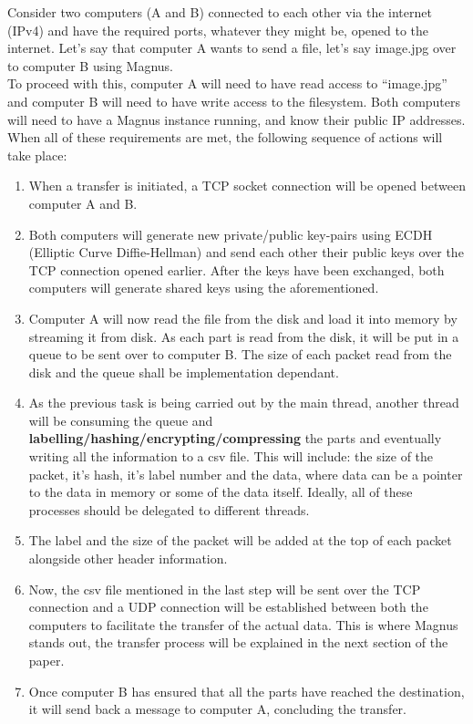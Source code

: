 \documentclass{article}
\begin{document}
Consider two computers (A and B) connected to each other via the internet
(IPv4) and have the required ports, whatever they might be, opened to the
internet. Let's say that computer A wants to send a file, let's say image.jpg
over to computer B using Magnus. \\

To proceed with this, computer A will need to have read access to ``image.jpg''
and computer B will need to have write access to the filesystem. Both computers
will need to have a Magnus instance running, and know their public IP
addresses. \\

When all of these requirements are met, the following sequence of actions will
take place:
\begin{enumerate}
      \item When a transfer is initiated, a TCP socket connection will be opened between
            computer A and B.
      \item Both computers will generate new private/public key-pairs using ECDH (Elliptic
            Curve Diffie-Hellman) and send each other their public keys over the TCP
            connection opened earlier. After the keys have been exchanged, both computers
            will generate shared keys using the aforementioned.
      \item Computer A will now read the file from the disk and load it into memory by
            streaming it from disk. As each part is read from the disk, it will be put in a
            queue to be sent over to computer B. The size of each packet read from the disk
            and the queue shall be implementation dependant.
      \item As the previous task is being carried out by the main thread, another thread
            will be consuming the queue and
            \textbf{labelling/hashing/encrypting/compressing} the parts and eventually
            writing all the information to a csv file. This will include: the size of the
            packet, it's hash, it's label number and the data, where data can be a pointer
            to the data in memory or some of the data itself. Ideally, all of these
            processes should be delegated to different threads.
      \item The label and the size of the packet will be added at the top of each packet
            alongside other header information.
      \item Now, the csv file mentioned in the last step will be sent over the TCP
            connection and a UDP connection will be established between both the computers
            to facilitate the transfer of the actual data. This is where Magnus stands out,
            the transfer process will be explained in the next section of the paper.
      \item Once computer B has ensured that all the parts have reached the destination, it
            will send back a message to computer A, concluding the transfer.
\end{enumerate}
\end{document}
